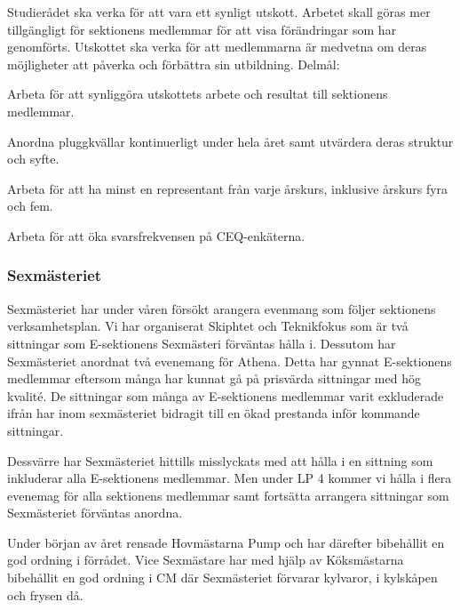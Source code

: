 \documentclass[../_main/handlingar.tex]{subfiles}
\begin{document}
Studierådet ska verka för att vara ett synligt utskott. Arbetet skall göras mer tillgängligt för sektionens medlemmar för att visa förändringar som har genomförts. Utskottet ska verka för att medlemmarna är medvetna om deras möjligheter att påverka och förbättra sin utbildning.
Delmål:
\begin{dashlist}
    \item Arbeta för att synliggöra utskottets arbete och resultat till sektionens medlemmar. 
    \item Anordna pluggkvällar kontinuerligt under hela året samt utvärdera deras struktur och syfte.
    \item Arbeta för att ha minst en representant från varje årskurs, inklusive årskurs fyra och fem.
    \item Arbeta för att öka svarsfrekvensen på CEQ-enkäterna.
\end{dashlist}

\subsubsection*{Sexmästeriet}
Sexmästeriet har under våren  försökt arangera evenmang som följer sektionens verksamhetsplan. Vi har organiserat Skiphtet och Teknikfokus som är två sittningar som E-sektionens Sexmästeri förväntas hålla i. Dessutom har Sexmästeriet anordnat två evenemang för Athena. Detta har gynnat E-sektionens medlemmar eftersom många har kunnat gå på prisvärda sittningar med hög kvalité. De sittningar som många av E-sektionens medlemmar varit exkluderade ifrån har inom sexmästeriet bidragit till en ökad prestanda inför kommande sittningar. 

Dessvärre har Sexmästeriet hittills misslyckats med att hålla i en sittning som inkluderar alla E-sektionens medlemmar. Men under LP 4 kommer vi hålla i flera evenemag för alla sektionens medlemmar samt fortsätta arrangera sittningar som Sexmästeriet förväntas anordna.

Under början av året rensade Hovmästarna Pump och har därefter bibehållit en god ordning i förrådet. Vice Sexmästare har med hjälp av Köksmästarna bibehållit en god ordning i CM där Sexmästeriet förvarar kylvaror, i kylskåpen och frysen då.
\end{document}
